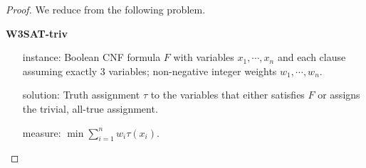 \Tmain*
\begin{proof}
We reduce from the following problem.
\begin{problem}{\bf W3SAT-triv}
\begin{itemize}
\item[\sc instance:] Boolean CNF formula $F$ with variables $x_1,\cdots,x_n$ and each clause assuming exactly 3 variables; non-negative integer weights $w_1,\cdots, w_n$.
\item[\sc solution:] Truth assignment $\tau$ to the variables that either satisfies $F$ or assigns the trivial, all-true assignment.
\item[\sc measure:] $\min \sum_{i=1}^n w_i \tau(x_i)$.
\end{itemize}
\end{problem}


\end{proof}
